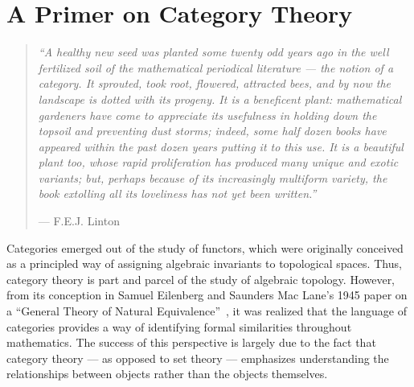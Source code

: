 
%
%

\chapter{A Primer on Category Theory}%
\label{sec:categories}

\begin{quote}
{\em ``A healthy new seed was planted some twenty odd years ago in the well fertilized soil of the mathematical periodical literature --- the notion of a category. It sprouted, took root, flowered, attracted bees, and by now the landscape is dotted with its progeny. It is a beneficent plant: mathematical gardeners have come to appreciate its usefulness in holding down the topsoil and preventing dust storms; indeed, some half dozen books have appeared within the past dozen years putting it to this use. It is a beautiful plant too, whose rapid proliferation has produced many unique and exotic variants; but, perhaps because of its increasingly multiform variety, the book extolling all its loveliness has not yet been written.''}
\begin{flushright} --- F.E.J. Linton~\cite{linton1965} \end{flushright}
\end{quote}

Categories emerged out of the study of functors, which were originally conceived as a principled way of assigning algebraic invariants to topological spaces. Thus, category theory is part and parcel of the study of algebraic topology. However, from its conception in Samuel Eilenberg and Saunders Mac Lane's 1945 paper on a ``General Theory of Natural Equivalence''~\cite{em-cat45}, it was realized that the language of categories provides a way of identifying formal similarities throughout mathematics. The success of this perspective is largely due to the fact that category theory --- as opposed to set theory --- emphasizes understanding the relationships between objects rather than the objects themselves.

